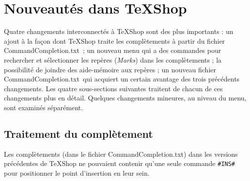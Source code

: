 \documentclass[11pt,french]{article}
\newcommand{\cmdkey}{\textsf{Cmd}}
\newcommand{\mnu}[1]{\textsf{#1}}
\newcommand{\cmd}[1]{\textsf{#1}}
\newcommand{\To}{\,\(\to\)\,}
\newcommand{\TS}{\textsf{\TeX Shop}}
\newcommand{\CCT}{\textsf{CommandCompletion.txt}}
\begin{document}

\section*{Nouveautés dans \TS}

Quatre changements interconnectés à \TS{} sont des plus importants : un ajout à la façon dont \TS{} traite 
les complètements à partir du fichier \CCT\ ; un nouveau menu qui a des commandes pour 
rechercher et sélectionner les repères (\emph{Marks}) dans les complètements ; la possibilité de joindre des aide-mémoire aux repères ; un nouveau fichier \CCT\ qui acquiert un certain avantage 
des trois précédents changements. Les quatre sous-sections suivantes traitent de chacun de ces changements plus 
en détail. Quelques changements mineures, au niveau du menu, sont examinés séparément.


\subsection*{Traitement du complètement}

Les complètements (dans le fichier \CCT) dans les versions précédentes de \TS{} ne 
pouvaient contenir qu'une seule commande \texttt{\#INS\#} pour positionner le point d'insertion en leur sein. 
\end{document}
